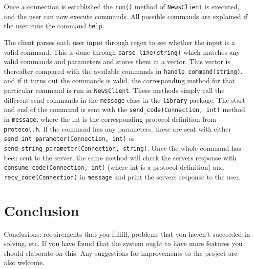 \documentclass[a4paper]{article}
\begin{document}
Once a connection is established the \texttt{run()} method of \texttt{NewsClient} is executed, and the user can now execute commands. All possible commands are explained if the user runs the command \texttt{help}.

The client parses each user input through regex to see whether the input is a valid command. This is done through \texttt{parse\_line(string)} which matches any valid commands and parameters and stores them in a vector. This vector is thereafter compared with the available commands in \texttt{handle\_command(string)}, and if it turns out the commands is valid, the corresponding method for that particular command is run in \texttt{NewsClient}. These methods simply call the different send commands in the \texttt{message} class in the \texttt{library} package. The start and end of the command is sent with the \texttt{send\_code(Connection, int)} method in \texttt{message}, where the int is the corresponding protocol definition from \texttt{protocol.h}. If the command has any parameters, these are sent with either \texttt{send\_int\_parameter(Connection, int)} or \texttt{send\_string\_parameter(Connection, string)}. Once the whole command has been sent to the server, the same method will check the servers response with \texttt{consume\_code(Connection, int)} (where int is a protocol definition) and \texttt{recv\_code(Connection)} in \texttt{message} and print the servers response to the user.


\section{Conclusion}

Conclusions: requirements that you fulfill, problems that you haven’t succeeded in solving,
etc. If you have found that the system ought to have more features you should elaborate on
this. Any suggestions for improvements to the project are also welcome.
\end{document}
